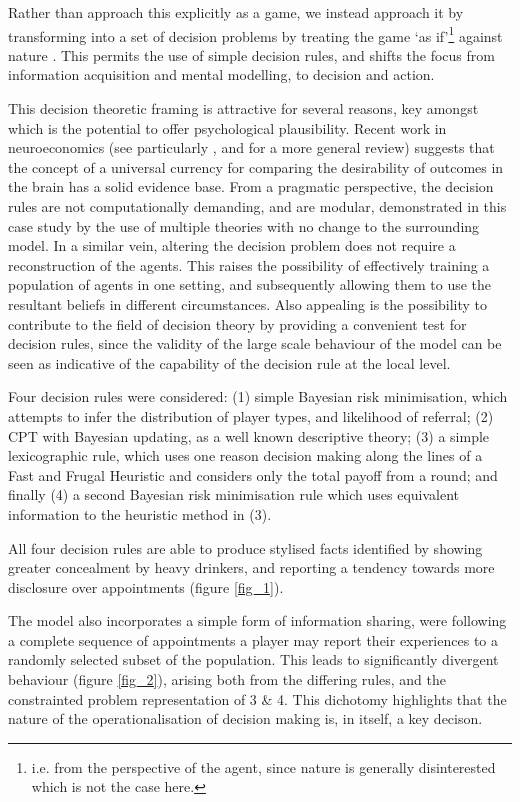 \documentclass[twocolumn]{article}
\begin{document}
Rather than approach this explicitly as a game, we instead approach it by transforming into a set of decision problems by treating the game `as if'\footnote{i.e. from the perspective of the agent, since nature is generally disinterested which is not the case here.} against nature \citep{RiosInsua2009}. This permits the use of simple decision rules, and shifts the focus from information acquisition and mental modelling, to decision and action. 

This decision theoretic framing is attractive for several reasons, key amongst which is the potential to offer psychological plausibility. Recent work in neuroeconomics (see particularly \citep{Padoa-Schioppa2006}, and \citep{Rustichini2009} for a more general review) suggests that the concept of a universal currency for comparing the desirability of outcomes in the brain has a solid evidence base.  
From a pragmatic perspective, the decision rules are not computationally demanding, and are modular, demonstrated in this case study by the use of multiple theories with no change to the surrounding model.  In a similar vein, altering the decision problem does not require a reconstruction of the agents. This raises the possibility of effectively training a population of agents in one setting, and subsequently allowing them to use the resultant beliefs in different circumstances. Also appealing is the possibility to contribute to the field of decision theory by providing a convenient test for decision rules, since the validity of the large scale behaviour of the model can be seen as indicative of the capability of the decision rule at the local level.

Four decision rules were considered: (1) simple Bayesian risk minimisation, which attempts to infer the distribution of player types, and likelihood of referral; (2) \ac{CPT} \citep{Tversky1992} with Bayesian updating, as a well known descriptive theory; (3) a simple lexicographic rule, which uses one reason decision making along the lines of a Fast and Frugal Heuristic \citep{Gigerenzer1996} and considers only the total payoff from a round; and finally (4) a second Bayesian risk minimisation rule which uses equivalent information to the heuristic method in (3).

All four decision rules are able to produce stylised facts identified by \citep{Alvik2006} showing greater concealment by heavy drinkers, and \citep{Phillips2007} reporting a tendency towards more disclosure over appointments (figure \ref{fig_1}). 

The model also incorporates a simple form of information sharing, were following a complete sequence of appointments a player may report their experiences to a randomly selected subset of the population. This leads to significantly divergent behaviour (figure \ref{fig_2}), arising both from the differing rules, and the constrainted problem representation of 3 \& 4. This dichotomy highlights that the nature of the operationalisation of decision making is, in itself, a key decison.
\end{document}
